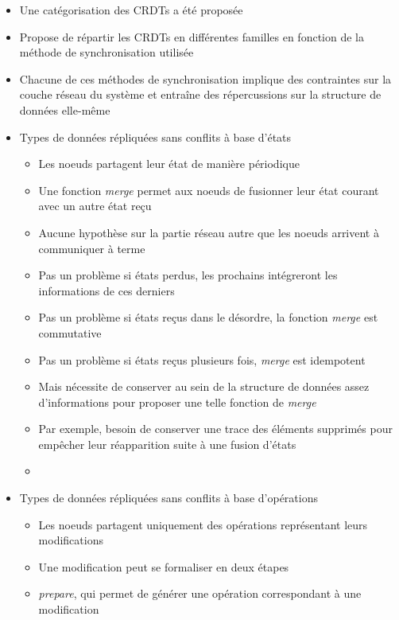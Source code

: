 \documentclass[12pt]{thesul}
\begin{document}
\begin{itemize}
  \item Une catégorisation des CRDTs a été proposée
  \item Propose de répartir les CRDTs en différentes familles en fonction de la méthode de synchronisation utilisée
  \item Chacune de ces méthodes de synchronisation implique des contraintes sur la couche réseau du système et entraîne des répercussions sur la structure de données elle-même
  \item Types de données répliquées sans conflits à base d'états \cite{shapiro_2011_crdt, shapiro:inria-00555588}
  \begin{itemize}
    \item Les noeuds partagent leur état de manière périodique
    \item Une fonction \emph{merge} permet aux noeuds de fusionner leur état courant avec un autre état reçu
    \item Aucune hypothèse sur la partie réseau autre que les noeuds arrivent à communiquer à terme
    \item Pas un problème si états perdus, les prochains intégreront les informations de ces derniers
    \item Pas un problème si états reçus dans le désordre, la fonction \emph{merge} est commutative
    \item Pas un problème si états reçus plusieurs fois, \emph{merge} est idempotent
    \item Mais nécessite de conserver au sein de la structure de données assez d'informations pour proposer une telle fonction de \emph{merge}
    \item Par exemple, besoin de conserver une trace des éléments supprimés pour empêcher leur réapparition suite à une fusion d'états
    \item {}
  \end{itemize}
  \item Types de données répliquées sans conflits à base d'opérations \cite{shapiro_2011_crdt, shapiro:inria-00555588, 10.1145/2596631.2596632, baquero2017pure}
  \begin{itemize}
    \item Les noeuds partagent uniquement des opérations représentant leurs modifications
    \item Une modification peut se formaliser en deux étapes
    \item \emph{prepare}, qui permet de générer une opération correspondant à une modification

\end{itemize}
\end{itemize}
\end{document}
